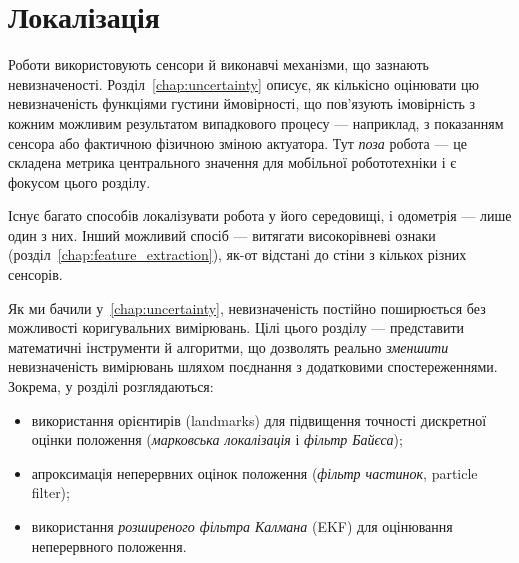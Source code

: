 \chapter{Локалізація}\label{chap:localization}
Роботи використовують сенсори й виконавчі механізми, що зазнають невизначеності. Розділ~\ref{chap:uncertainty} описує, як кількісно оцінювати цю невизначеність функціями густини ймовірності, що пов'язують імовірність з кожним можливим результатом випадкового процесу — наприклад, з показанням сенсора або фактичною фізичною зміною актуатора. Тут \emph{поза} робота — це складена метрика центрального значення для мобільної робототехніки і є фокусом цього розділу.

Існує багато способів локалізувати робота у його середовищі, і одометрія — лише один з них. Інший можливий спосіб — витягати високорівневі ознаки (розділ~\ref{chap:feature_extraction}), як-от відстані до стіни з кількох різних сенсорів.

Як ми бачили у~\cref{chap:uncertainty}, невизначеність постійно поширюється без можливості коригувальних вимірювань. Цілі цього розділу — представити математичні інструменти й алгоритми, що дозволять реально \emph{зменшити} невизначеність вимірювань шляхом поєднання з додатковими спостереженнями. Зокрема, у розділі розглядаються:
\begin{itemize}
    \item використання орієнтирів (landmarks) для підвищення точності дискретної оцінки положення (\emph{марковська локалізація} і \emph{фільтр Байєса});
    \item апроксимація неперервних оцінок положення (\emph{фільтр частинок}, particle filter);
    \item використання \emph{розширеного фільтра Калмана} (EKF) для оцінювання неперервного положення.
\end{itemize}

